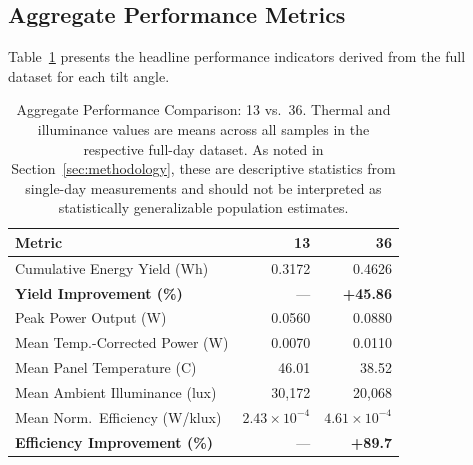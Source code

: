 \documentclass[conference]{IEEEtran}
\begin{document}
\subsection{Aggregate Performance Metrics}

Table~\ref{tab:aggregate} presents the headline performance indicators derived from the full
dataset for each tilt angle.

\begin{table}[H]
  \caption{Aggregate Performance Comparison: 13\degree{} vs.\ 36\degree{}. Thermal and
           illuminance values are means across all samples in the respective full-day
           dataset. As noted in Section~\ref{sec:methodology}, these are descriptive
           statistics from single-day measurements and should not be interpreted as
           statistically generalizable population estimates.}
  \label{tab:aggregate}
  \centering
  \renewcommand{\arraystretch}{1.2}
  \begin{tabular}{@{}lrr@{}}
    \toprule
    Metric & 13\degree{} & 36\degree{} \\
    \midrule
    Cumulative Energy Yield (Wh)            & 0.3172 & 0.4626 \\
    \textbf{Yield Improvement (\%)}         & ---    & \textbf{+45.86} \\
    Peak Power Output (W)                   & 0.0560 & 0.0880 \\
    Mean Temp.-Corrected Power (W)          & 0.0070 & 0.0110 \\
    Mean Panel Temperature (\degree{}C)     & 46.01  & 38.52  \\
    Mean Ambient Illuminance (lux)          & 30{,}172 & 20{,}068 \\
    Mean Norm.\ Efficiency (W/klux)         & $2.43 \times 10^{-4}$ & $4.61 \times 10^{-4}$ \\
    \textbf{Efficiency Improvement (\%)}    & ---    & \textbf{+89.7} \\
    \bottomrule
  \end{tabular}
\end{table}
\end{document}
